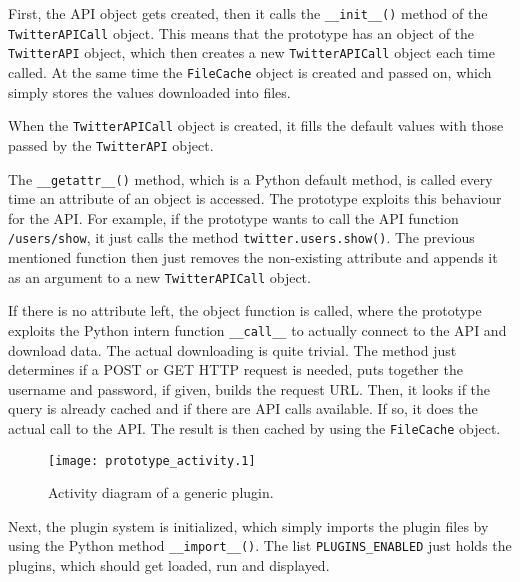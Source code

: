 \lstset{language=Python}

First, the API object gets created, then it calls the \texttt{\_\_init\_\_()}
method of the \texttt{TwitterAPICall} object. This means that the prototype
has an object of the \texttt{TwitterAPI} object, which then creates a new
\texttt{TwitterAPICall} object each time called. At the same time the
\texttt{FileCache} object is created and passed on, which simply stores the
values downloaded into files.

When the \texttt{TwitterAPICall} object is created, it fills the default
values with those passed by the \texttt{TwitterAPI} object.

The \texttt{\_\_getattr\_\_()} method, which is a Python default method, is
called every time an attribute of an object is accessed. The prototype exploits
this behaviour for the \Twitter{} API. For example, if the prototype wants to
call the API function \texttt{/users/show}, it just calls the method
\texttt{twitter.users.show()}. The previous mentioned function then just
removes the non-existing attribute and appends it as an argument to a new
\texttt{TwitterAPICall} object.

If there is no attribute left, the object function is called, where the
prototype exploits the Python intern function \texttt{\_\_call\_\_} to actually
connect to the \Twitter{} API and download data. The actual downloading is
quite trivial. The method just determines if a POST or GET HTTP request is
needed, puts together the username and password, if given, builds the request
URL. Then, it looks if the query is already cached and if there are API calls
available. If so, it does the actual call to the \Twitter{} API. The result is
then cached by using the \texttt{FileCache} object.

\begin{figure}[htb]
  \begin{center}
    \texttt{[image: prototype\_activity.1]}
    \caption{Activity diagram of a generic plugin.}
    \label{fig:prototype_activity}
  \end{center}
\end{figure}

Next, the plugin system is initialized, which simply imports the plugin files
by using the Python method \texttt{\_\_import\_\_()}. The list
\texttt{PLUGINS\_ENABLED} just holds the plugins, which should get loaded, run
and displayed.

